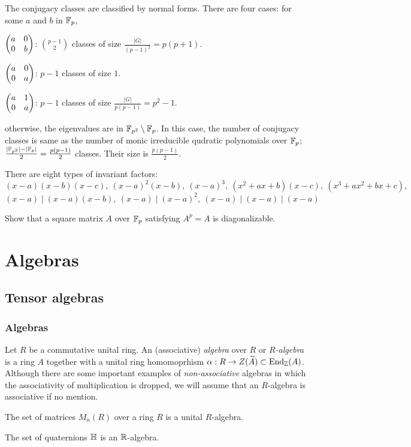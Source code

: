 \documentclass{../../large}
\begin{document}
\begin{prb}
The conjugacy classes are classified by normal forms.
There are four cases: for some $a$ and $b$ in $\mathbb{F}_p$,
\begin{parts}
\item $\begin{pmatrix}a&0\\0&b\end{pmatrix}$: $\binom{p-1}2$ classes of size $\frac{|G|}{(p-1)^2}=p(p+1)$.
\item $\begin{pmatrix}a&0\\0&a\end{pmatrix}$: $p-1$ classes of size $1$.
\item $\begin{pmatrix}a&1\\0&a\end{pmatrix}$: $p-1$ classes of size $\frac{|G|}{p(p-1)}=p^2-1$.
\item otherwise, the eigenvalues are in $\mathbb{F}_{p^2}\setminus\mathbb{F}_p$.
In this case, the number of conjugacy classes is same as the number of monic irreducible qudratic polynomials over $\mathbb{F}_p$; $\frac{|\mathbb{F}_{p^2}|-|\mathbb{F}_p|}2=\frac{p(p-1)}2$ classes.
Their size is $\frac{p(p-1)}2$.
\end{parts}
\end{prb}

\begin{prb}
There are eight types of invariant factors:
\[(x-a)(x-b)(x-c),\ (x-a)^2(x-b),\ (x-a)^3,\ (x^2+ax+b)(x-c),\ (x^3+ax^2+bx+c),\]
\[(x-a)\mid(x-a)(x-b),\ (x-a)\mid(x-a)^2,\ (x-a)\mid(x-a)\mid(x-a)\]
\end{prb}

Show that a square matrix $A$ over $\mathbb{F}_p$ satisfying $A^p=A$ is diagonalizable.


\part{Algebras}

\chapter{Tensor algebras}

\section{Algebras}
\begin{prb}
Let $R$ be a commutative unital ring.
An (associative) \emph{algebra} over $R$ or \emph{$R$-algebra} is a ring $A$ together with a unital ring homomoprhism $\alpha:R\to Z(\widetilde A)\subset\operatorname{End}_{\mathbb{Z}}(A)$.
Although there are some important examples of \emph{non-associative} algebras in which the associativity of multiplication is dropped, we will assume that an $R$-algebra is associative if no mention.
\begin{parts}
\item The set of matrices $M_n(R)$ over a ring $R$ is a unital $R$-algebra.
\item The set of quaternions $\mathbb{H}$ is an $\mathbb{R}$-algebra.
\end{parts}
\end{prb}
\end{document}
